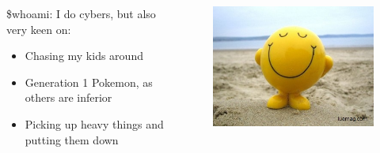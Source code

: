\documentclass{beamer}
\begin{document}
\begin{frame}
    \begin{columns}
        \begin{column}{0.5\textwidth}
            \$whoami: I do cybers, but also very keen on:
            \begin{itemize}
                \item Chasing my kids around
                \item Generation 1 Pokemon, as others are inferior
                \item Picking up heavy things and putting them down
            \end{itemize}
        \end{column}
        \begin{column}{0.5\textwidth}
            \begin{figure}
                \centering
                \includegraphics[width=\textwidth,keepaspectratio]{../resources/smile.jpg}
            \end{figure}
        \end{column}
    \end{columns}
\end{frame}
\end{document}
